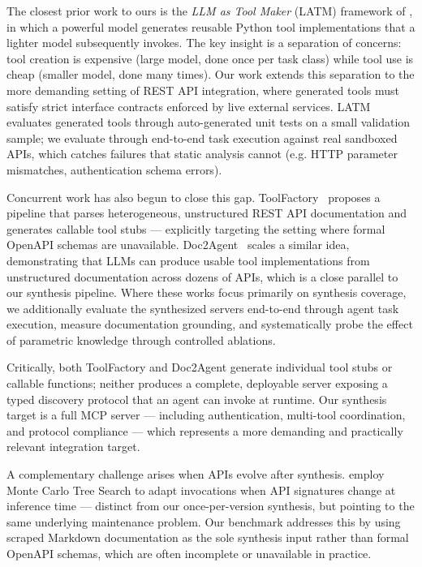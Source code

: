 The closest prior work to ours is the \emph{LLM as Tool Maker} (LATM) framework of \citet{cai2023latm}, in which a powerful model generates reusable Python tool implementations that a lighter model subsequently invokes. The key insight is a separation of concerns: tool creation is expensive (large model, done once per task class) while tool use is cheap (smaller model, done many times). Our work extends this separation to the more demanding setting of REST API integration, where generated tools must satisfy strict interface contracts enforced by live
external services. LATM evaluates generated tools through auto-generated unit tests on a small validation sample; we evaluate through end-to-end task execution against real sandboxed APIs, which catches failures that static analysis cannot (e.g. HTTP parameter mismatches, authentication schema errors).

Concurrent work has also begun to close this gap. ToolFactory~\citep{toolfactory2025} proposes a pipeline that parses heterogeneous, unstructured REST API documentation and generates callable tool stubs --- explicitly targeting the
setting where formal OpenAPI schemas are unavailable. Doc2Agent~\citep{doc2agent2025} scales a similar idea, demonstrating that LLMs can produce usable tool implementations from unstructured documentation across dozens of APIs, which is a close parallel to our synthesis pipeline. Where these works focus primarily on synthesis coverage, we additionally evaluate the synthesized servers end-to-end through agent task execution, measure documentation grounding, and systematically probe the effect of parametric knowledge through controlled ablations.

Critically, both ToolFactory and Doc2Agent generate individual tool stubs or callable functions; neither produces a complete, deployable server exposing a typed discovery protocol that an agent can invoke at runtime. Our synthesis target is a full MCP server --- including authentication, multi-tool coordination, and protocol compliance --- which represents a more demanding and practically relevant integration target.

A complementary challenge arises when APIs evolve after synthesis. \citet{evolvingtoolsiclr2025} employ Monte Carlo Tree Search to adapt invocations when API signatures change at inference time --- distinct from our once-per-version synthesis, but pointing to the same underlying maintenance problem. Our benchmark addresses this by using scraped Markdown documentation as the sole synthesis input rather than formal OpenAPI schemas, which are often incomplete or unavailable in practice.

